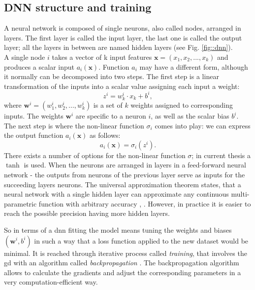 \subsection{DNN structure and training}
A neural network is composed of single neurons, also called nodes, arranged in layers. The first layer is called the input layer, the last one is called the output layer; all the layers in between are named hidden layers (see Fig. \ref{fig::dnn}). \\
A single node $i$ takes a vector of k input features $\textbf{x}=(x_1,x_2,...,x_k)$ and produces a scalar input $a_i(\textbf{x})$. Function $a_i$ may have a different form, although it normally can be decomposed into two steps. The first step is a linear transformation of the inputs into a scalar value assigning each input a weight:
\begin{equation}
z^{i}=w^{i}_k\cdot x_k+b^{i},
\end{equation}
where $\textbf{w}^i=(w^i_1,w^i_2,...,w^i_k)$ is a set of $k$ weights assigned to corresponding inputs. The weights $\textbf{w}^i$ are specific to a neuron $i$, as well as the scalar bias $b^i$. The next step is where the non-linear function $\sigma_i$ comes into play: we can express the output function $a_i(\textbf{x})$ as follows:
\begin{equation}
a_i(\textbf{x})=\sigma_i(z^{i}).
\end{equation}
There exists a number of options for the non-linear function $\sigma$; in current thesis a $\tanh$ is used. When the neurons are arranged in layers in a feed-forward neural network - the outputs from neurons of the previous layer serve as inputs for the succeeding layers neurons. The universal approximation theorem states, that a neural network with a single hidden layer can approximate any continuous multi-parametric function with arbitrary accuracy \cite{Kurt1991251}, \cite{Cybenko1989}. However, in practice it is easier to reach the possible precision having more hidden layers. 

So in terms of a \gls{dnn} fitting the model means tuning the weights and biases $(\textbf{w}^i,b^i)$ in such a way that a loss function applied to the new dataset would be minimal. It is reached through iterative process called \textit{training}, that involves the \gls{gd} with an algorithm called \textit{backpropagation} \cite{RumelhartZipser:86}. The backpropagation algorithm allows to calculate the gradients and adjust the corresponding parameters in a very computation-efficient way. 

